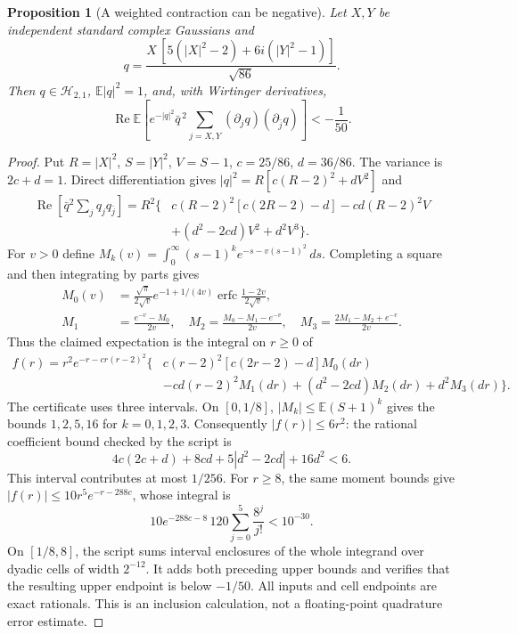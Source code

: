 \documentclass[11pt]{article}
\newtheorem{proposition}[theorem]{Proposition}
\newcommand{\E}{\mathbb E}
\newcommand{\Rea}{\operatorname{Re}}
\newcommand{\HH}{\mathcal H}
\begin{document}
\begin{proposition}[A weighted contraction can be negative]\label{prop:counter}
Let $X,Y$ be independent standard complex Gaussians and
\[
 q=\frac{X\,[5(|X|^2-2)+6i(|Y|^2-1)]}{\sqrt{86}}.
\]
Then $q\in\HH_{2,1}$, $\E|q|^2=1$, and, with Wirtinger derivatives,
\[
 \boxed{\quad
 \Rea\E\left[e^{-|q|^2}\bar q^{\,2}
 \sum_{j=X,Y}(\partial_jq)(\partial_{\bar j}q)\right]<-\frac1{50}.
 \quad}
\]
\end{proposition}
\begin{proof}
Put $R=|X|^2$, $S=|Y|^2$, $V=S-1$, $c=25/86$, $d=36/86$.
The variance is $2c+d=1$. Direct differentiation gives
$|q|^2=R[c(R-2)^2+dV^2]$ and
\begin{align*}
 \Rea\left[\bar q^2\sum_jq_jq_{\bar j}\right]
 =R^2\{&c(R-2)^2[c(2R-2)-d]-cd(R-2)^2V\\
       &+(d^2-2cd)V^2+d^2V^3\}.
\end{align*}
For $v>0$ define $M_k(v)=\int_0^\infty(s-1)^k e^{-s-v(s-1)^2}\,ds$.
Completing a square and then integrating by parts gives
\begin{align*}
 M_0(v)&=\frac{\sqrt\pi}{2\sqrt v}
 e^{-1+1/(4v)}\operatorname{erfc}\frac{1-2v}{2\sqrt v},\\
 M_1&=\frac{e^{-v}-M_0}{2v},\quad
 M_2=\frac{M_0-M_1-e^{-v}}{2v},\quad
 M_3=\frac{2M_1-M_2+e^{-v}}{2v}.
\end{align*}
Thus the claimed expectation is the integral on $r\ge0$ of
\begin{align*}
 f(r)=r^2e^{-r-cr(r-2)^2}\{&c(r-2)^2[c(2r-2)-d]M_0(dr)\\
 &-cd(r-2)^2M_1(dr)+(d^2-2cd)M_2(dr)+d^2M_3(dr)\}.
\end{align*}
The certificate uses three intervals. On $[0,1/8]$,
$|M_k|\le\E(S+1)^k$ gives the bounds $1,2,5,16$ for $k=0,1,2,3$.
Consequently $|f(r)|\le6r^2$: the rational coefficient bound checked by the
script is
\[
 4c(2c+d)+8cd+5|d^2-2cd|+16d^2<6.
\]
This interval contributes at most $1/256$.
For $r\ge8$, the same moment bounds give
$|f(r)|\le10r^5e^{-r-288c}$, whose integral is
\[
 10e^{-288c-8}\,120\sum_{j=0}^5\frac{8^j}{j!}<10^{-30}.
\]
On $[1/8,8]$, the script sums interval enclosures of the whole integrand
over dyadic cells of width $2^{-12}$. It adds both preceding upper bounds
and verifies that the resulting upper endpoint is below $-1/50$.
All inputs and cell endpoints are exact rationals. This is an inclusion
calculation, not a floating-point quadrature error estimate.
\end{proof}
\end{document}
